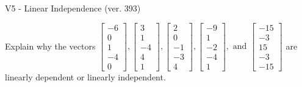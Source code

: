 \begin{exercise}
  \begin{exerciseTitle}V5 - Linear Independence (ver. 393)\end{exerciseTitle}
  \begin{exerciseStatement}
    Explain why the vectors \(\left[\begin{array}{r}
-6 \\
0 \\
1 \\
-4 \\
0
\end{array}\right] , \left[\begin{array}{r}
3 \\
1 \\
-4 \\
4 \\
1
\end{array}\right] , \left[\begin{array}{r}
2 \\
0 \\
-1 \\
-3 \\
4
\end{array}\right] , \left[\begin{array}{r}
-9 \\
1 \\
-2 \\
-4 \\
1
\end{array}\right] , \text{ and } \left[\begin{array}{r}
-15 \\
-3 \\
15 \\
-3 \\
-15
\end{array}\right]\) are linearly dependent or linearly independent.	



\end{exerciseStatement}
\end{exercise}
